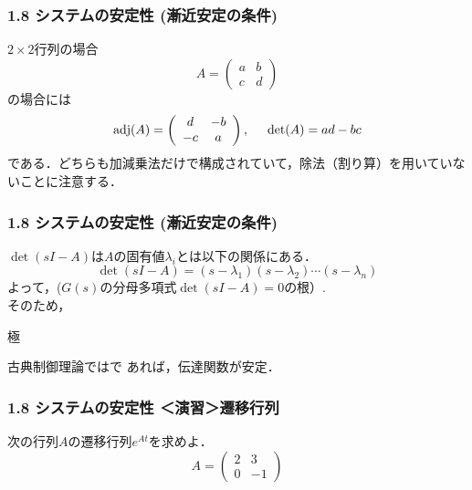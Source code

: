 \begin{frame}[t]
\frametitle{1.8 システムの安定性 (漸近安定の条件)}
$2 \times 2$行列の場合
\[
	A= \left(\begin{array}{cc}
		a & b \\
		c & d
	   \end{array} \right )
\]
の場合には
\[
	\mathop{\rm adj}\nolimits(A) = 
		\left(\begin{array}{cc}
			d & -b \\
			-c & a
		\end{array} \right )
	, \hspace{5mm}
	\mathop{\rm det}\nolimits(A)= ad -bc
\]
である．どちらも加減乗法だけで構成されていて，除法（割り算）を用いていないことに注意する．
\end{frame}


\begin{frame}[t]
\frametitle{1.8 システムの安定性 (漸近安定の条件)}
$\det (s I - A)$は$A$の固有値$\lambda_i$とは以下の関係にある．
\begin{equation}
 \det (s I - A)
  = (s - \lambda_1)(s - \lambda_2)\cdots(s - \lambda_n)
\end{equation}
よって，($G(s)$の分母多項式$\det (s I - A)=0$の根）.\\
そのため，

\begin{block}{極}
\\
\end{block}

古典制御理論ではで
あれば，伝達関数が安定．
\end{frame}


\begin{frame}[t]
\frametitle{1.8 システムの安定性 ＜演習＞遷移行列}
次の行列$A$の遷移行列$e^{At}$を求めよ．
\[
  A= \left(\begin{array}{cc}
    2 & 3 \\
    0 & -1
     \end{array} \right )
\]
\end{frame}


